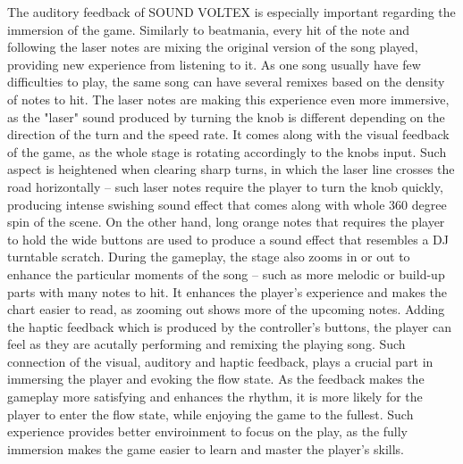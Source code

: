 The auditory feedback of SOUND VOLTEX is especially important regarding the immersion of the game. Similarly to beatmania, every hit of the note and following the laser notes are mixing the original version of the song played, providing new experience from listening to it. As one song usually have few difficulties to play, the same song can have several remixes based on the density of notes to hit. The laser notes are making this experience even more immersive, as the "laser" sound produced by turning the knob is different depending on the direction of the turn and the speed rate. It comes along with the visual feedback of the game, as the whole stage is rotating accordingly to the knobs input. Such aspect is heightened when clearing sharp turns, in which the laser line crosses the road horizontally -- such laser notes require the player to turn the knob quickly, producing intense swishing sound effect that comes along with whole 360 degree spin of the scene. On the other hand, long orange notes that requires the player to hold the wide buttons are used to produce a sound effect that resembles a DJ turntable scratch. During the gameplay, the stage also zooms in or out to enhance the particular moments of the song -- such as more melodic or build-up parts with many notes to hit. It enhances the player's experience and makes the chart easier to read, as zooming out shows more of the upcoming notes. Adding the haptic feedback which is produced by the controller's buttons, the player can feel as they are acutally performing and remixing the playing song.
Such connection of the visual, auditory and haptic feedback, plays a crucial part in immersing the player and evoking the flow state. As the feedback makes the gameplay more satisfying and enhances the rhythm, it is more likely for the player to enter the flow state, while enjoying the game to the fullest. Such experience provides better enviroinment to focus on the play, as the fully immersion makes the game easier to learn and master the player's skills. 

